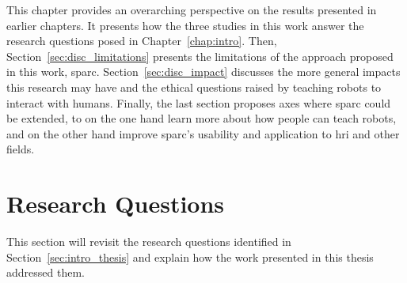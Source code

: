 This chapter provides an overarching perspective on the results presented in earlier chapters. It presents how the three studies in this work answer the research questions posed in Chapter~\ref{chap:intro}. Then, Section~\ref{sec:disc_limitations} presents the limitations of the approach proposed in this work, \gls{sparc}. Section~\ref{sec:disc_impact} discusses the more general impacts this research may have and the ethical questions raised by teaching robots to interact with humans.
Finally, the last section proposes axes where \gls{sparc} could be extended, to on the one hand learn more about how people can teach robots, and on the other hand improve \gls{sparc}'s usability and application to \gls{hri} and other fields.

\section{Research Questions} \label{sec:disc_rq}

This section will revisit the research questions identified in Section~\ref{sec:intro_thesis} and explain how the work presented in this thesis addressed them.

